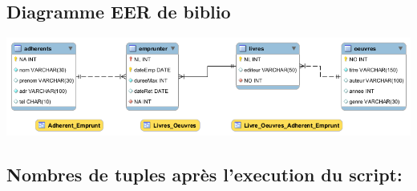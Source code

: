 \documentclass{article}
\begin{document}
\subsection{Diagramme EER de biblio}
\begin{center}
    \includegraphics[scale=0.6]{EER_Diagram.png}
\end{center}

\subsection{Nombres de tuples après l'execution du script:}
\end{document}
